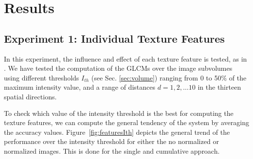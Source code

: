 \section{Results}\label{sec:ch5results}
\subsection{Experiment 1: Individual Texture Features}
In this experiment, the influence and effect of each texture feature is tested, as in \cite{Martinez-Murcia2013266}. We have tested the computation of the \acp{GLCM} over the image subvolumes using different thresholds $I_{th}$ (see Sec. \ref{sec:volume}) ranging from 0 to 50\% of the maximum intensity value, and a range of distances $d=1,2,\dots10$ in the thirteen spatial directions.

To check which value of the intensity threshold is the best for computing the texture features, we can compute the general tendency of the system by averaging the accuracy values. Figure~\ref{fig:featuresIth} depicts the general trend of the performance over the intensity threshold for either the no normalized or normalized images. This is done for the single and cumulative approach. 

